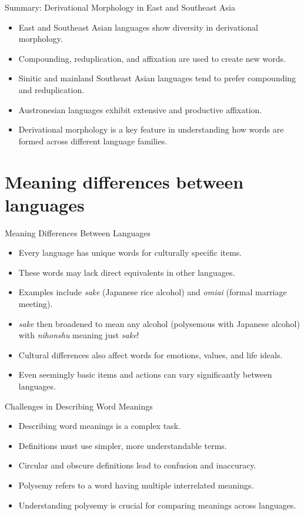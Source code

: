 \documentclass{beamer}
\begin{document}
\begin{frame}{Summary: Derivational Morphology in East and Southeast Asia}
    \begin{itemize}
        \item East and Southeast Asian languages show diversity in derivational morphology.
        \item Compounding, reduplication, and affixation are used to create new words.
        \item Sinitic and mainland Southeast Asian languages tend to prefer compounding and reduplication.
        \item Austronesian languages exhibit extensive and productive affixation.
        \item Derivational morphology is a key feature in understanding how words are formed across different language families.
    \end{itemize}
\end{frame}

\section{Meaning differences between languages}

\begin{frame}{Meaning Differences Between Languages}
    \begin{itemize}
        \item Every language has unique words for culturally specific items.
        \item These words may lack direct equivalents in other languages.
        \item Examples include \textit{sake} (Japanese rice alcohol) and \textit{omiai} (formal marriage meeting).
          \item  \textit{sake} then broadened to mean any alcohol (polysemous with Japanese alcohol) with  \textit{nihonshu} meaning just  \textit{sake}!  
        \item Cultural differences also affect words for emotions, values, and life ideals.
        \item Even seemingly basic items and actions can vary significantly between languages.
    \end{itemize}
\end{frame}

\begin{frame}{Challenges in Describing Word Meanings}
    \begin{itemize}
        \item Describing word meanings is a complex task.
        \item Definitions must use simpler, more understandable terms.
        \item Circular and obscure definitions lead to confusion and inaccuracy.
        \item Polysemy refers to a word having multiple interrelated meanings.
        \item Understanding polysemy is crucial for comparing meanings across languages.
    \end{itemize}
\end{frame}
\end{document}
